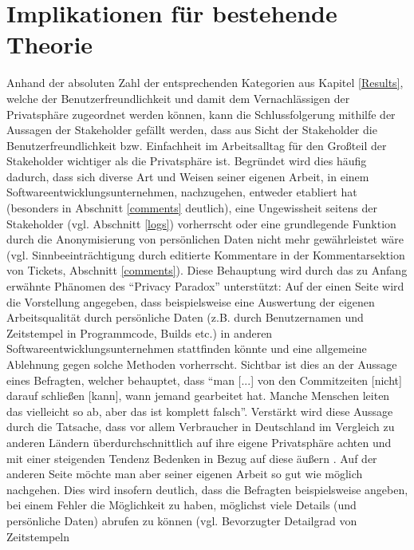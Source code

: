 \section{Implikationen für bestehende Theorie}
Anhand der absoluten Zahl der entsprechenden Kategorien aus Kapitel \ref{Results}, welche der Benutzerfreundlichkeit und damit dem Vernachlässigen der
Privatsphäre zugeordnet werden können, kann die Schlussfolgerung mithilfe der Aussagen der Stakeholder gefällt werden, dass aus Sicht der Stakeholder die Benutzerfreundlichkeit bzw. Einfachheit
im Arbeitsalltag für den Großteil der Stakeholder wichtiger als die Privatsphäre ist. Begründet wird dies häufig dadurch, dass sich diverse Art und Weisen seiner eigenen Arbeit, in einem Softwareentwicklungsunternehmen,
nachzugehen, entweder etabliert hat (besonders in Abschnitt \ref{comments} deutlich), eine Ungewissheit seitens der Stakeholder (vgl. Abschnitt \ref{logs}) vorherrscht oder eine grundlegende Funktion durch die Anonymisierung
von persönlichen Daten nicht mehr gewährleistet wäre (vgl. Sinnbeeinträchtigung durch editierte Kommentare in der Kommentarsektion von Tickets, Abschnitt \ref{comments}). \newline
Diese Behauptung wird durch das zu Anfang erwähnte Phänomen des \enquote{Privacy Paradox} unterstützt: Auf der einen Seite wird die Vorstellung angegeben, dass beispielsweise eine Auswertung der eigenen Arbeitsqualität 
durch persönliche Daten (z.B. durch Benutzernamen und Zeitstempel in Programmcode, Builds etc.) in anderen Softwareentwicklungsunternehmen stattfinden könnte und eine allgemeine Ablehnung gegen solche Methoden vorherrscht. Sichtbar ist dies
an der Aussage eines Befragten, welcher behauptet, dass \enquote{man [...] von den Commitzeiten [nicht] darauf schließen [kann], wann jemand gearbeitet hat. Manche Menschen leiten das vielleicht so ab, aber das ist komplett falsch}. Verstärkt wird diese Aussage durch die Tatsache, dass vor allem Verbraucher in Deutschland im Vergleich zu anderen Ländern überdurchschnittlich auf ihre eigene Privatsphäre achten \cite{IfH:2015aa} und mit einer steigenden Tendenz
Bedenken in Bezug auf diese äußern \cite{Bansal:2016aa}. \newline
Auf der anderen Seite möchte man aber seiner eigenen Arbeit so gut wie möglich nachgehen. Dies wird insofern deutlich, dass die Befragten beispielsweise angeben, bei einem Fehler die Möglichkeit zu haben, möglichst viele Details (und persönliche Daten) abrufen zu können (vgl. Bevorzugter Detailgrad von Zeitstempeln
